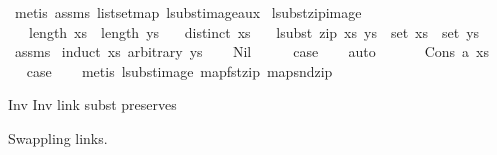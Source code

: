 \begin{isabellebody}
%
\isadelimproof
%
\endisadelimproof
%
\isatagproof
{}\isamarkupfalse%
\ {\isacharparenleft}{\kern0pt}metis\ assms\ list{\isachardot}{\kern0pt}set{\isacharunderscore}{\kern0pt}map\ lsubst{\isacharunderscore}{\kern0pt}image{\isacharunderscore}{\kern0pt}aux{\isacharparenright}{\kern0pt}%
\endisatagproof
{\isafoldproof}%
%
\isadelimproof
\isanewline
%
\endisadelimproof
\isanewline
\isanewline
{}\isamarkupfalse%
\ lsubst{\isacharunderscore}{\kern0pt}zip{\isacharunderscore}{\kern0pt}image{\isacharcolon}{\kern0pt}\isanewline
\ \ \ {\isachardoublequoteopen}length\ xs\ {\isacharequal}{\kern0pt}\ length\ ys{\isachardoublequoteclose}\isanewline
\ \ \ {\isachardoublequoteopen}distinct\ xs{\isachardoublequoteclose}\isanewline
\ \ \ {\isachardoublequoteopen}lsubst\ {\isacharparenleft}{\kern0pt}zip\ xs\ ys{\isacharparenright}{\kern0pt}\ {\isacharbackquote}{\kern0pt}\ set\ xs\ {\isacharequal}{\kern0pt}\ set\ ys{\isachardoublequoteclose}\isanewline
%
\isadelimproof
%
\endisadelimproof
%
\isatagproof
{}\isamarkupfalse%
\ assms\isanewline
{}\isamarkupfalse%
\ {\isacharparenleft}{\kern0pt}induct\ xs\ arbitrary{\isacharcolon}{\kern0pt}\ ys{\isacharparenright}{\kern0pt}\isanewline
\ \ \isamarkupfalse%
\ Nil\isanewline
\ \ \isamarkupfalse%
\ \isamarkupfalse%
\ {\isacharquery}{\kern0pt}case\isanewline
\ \ \isamarkupfalse%
\ auto\isanewline
\ \ \isamarkupfalse%
\isanewline
{}\isamarkupfalse%
\isanewline
\ \ \isamarkupfalse%
\ {\isacharparenleft}{\kern0pt}Cons\ a\ xs{\isacharparenright}{\kern0pt}\isanewline
\ \ \isamarkupfalse%
\ \isamarkupfalse%
\ {\isacharquery}{\kern0pt}case\isanewline
\ \ \isamarkupfalse%
\ {\isacharparenleft}{\kern0pt}metis\ lsubst{\isacharunderscore}{\kern0pt}image\ map{\isacharunderscore}{\kern0pt}fst{\isacharunderscore}{\kern0pt}zip\ map{\isacharunderscore}{\kern0pt}snd{\isacharunderscore}{\kern0pt}zip{\isacharparenright}{\kern0pt}\isanewline
{}\isamarkupfalse%
%
\endisatagproof
{\isafoldproof}%
%
\isadelimproof
%
\endisadelimproof
%
\begin{isamarkuptext}%
Inv Inv link subst preserves%
\end{isamarkuptext}\isamarkuptrue%
%
\begin{isamarkuptext}%
Swappling links.%
\end{isamarkuptext}\isamarkuptrue%

\end{isabellebody}
